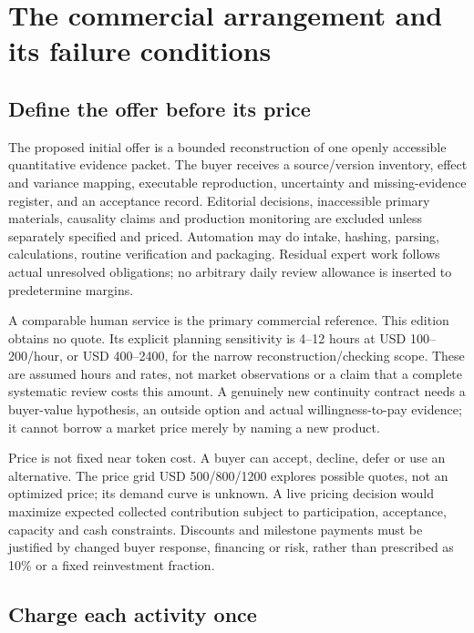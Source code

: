 \documentclass[11pt]{article}
\begin{document}
\section{The commercial arrangement and its failure conditions}

\subsection{Define the offer before its price}

The proposed initial offer is a bounded reconstruction of one openly accessible quantitative evidence packet. The buyer receives a source/version inventory, effect and variance mapping, executable reproduction, uncertainty and missing-evidence register, and an acceptance record. Editorial decisions, inaccessible primary materials, causality claims and production monitoring are excluded unless separately specified and priced. Automation may do intake, hashing, parsing, calculations, routine verification and packaging. Residual expert work follows actual unresolved obligations; no arbitrary daily review allowance is inserted to predetermine margins.

A comparable human service is the primary commercial reference. This edition obtains no quote. Its explicit planning sensitivity is 4–12 hours at USD 100–200/hour, or USD 400–2400, for the narrow reconstruction/checking scope. These are assumed hours and rates, not market observations or a claim that a complete systematic review costs this amount. A genuinely new continuity contract needs a buyer-value hypothesis, an outside option and actual willingness-to-pay evidence; it cannot borrow a market price merely by naming a new product.

Price is not fixed near token cost. A buyer can accept, decline, defer or use an alternative. The price grid USD 500/800/1200 explores possible quotes, not an optimized price; its demand curve is unknown. A live pricing decision would maximize expected collected contribution subject to participation, acceptance, capacity and cash constraints. Discounts and milestone payments must be justified by changed buyer response, financing or risk, rather than prescribed as 10\% or a fixed reinvestment fraction.

\subsection{Charge each activity once}
\end{document}
